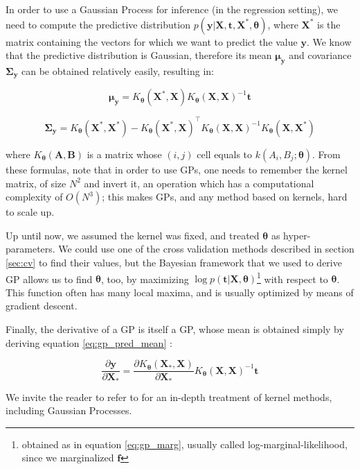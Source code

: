 \documentclass[a4paper,11pt]{kth-mag}
\begin{document}
In order to use a Gaussian Process for inference (in the regression setting), we need to compute the predictive distribution $p(\bm y\vert\bm X, \bm t, \bm X^*,\bm\theta) $, where $\bm X^*$ is the matrix containing the vectors for which we want to predict the value $\bm y$. We know that the predictive distribution is Gaussian, therefore its mean $\bm\mu_{\bm y}$ and covariance $\bm\Sigma_{\bm y}$ can be obtained relatively easily, resulting in:

\begin{equation}
\label{eq:gp_pred_mean}
\bm\mu_{\bm y}=K_{\bm\theta}(\bm X^*,\bm X) K_{\bm\theta}(\bm X,\bm X)^{-1}\bm t
\end{equation}

\begin{equation}
\bm\Sigma_{\bm y}=K_{\bm\theta}(\bm X^*,\bm X^*)-K_{\bm\theta}(\bm X^*,\bm X)^\intercal K_{\bm\theta}(\bm X, \bm X)^{-1}K_{\bm\theta}(\bm X,\bm X^*)
\end{equation}

\noindent where $K_{\bm\theta}(\bm A,\bm B)$ is a matrix whose $(i,j)$ cell equals to $k(A_i,B_j;\bm\theta)$. From these formulas, note that in order to use GPs, one needs to remember the kernel matrix, of size $N^2$ and invert it, an operation which has a computational complexity of $O(N^3)$; this makes GPs, and any method based on kernels, hard to scale up.

Up until now, we assumed the kernel was fixed, and treated $\bm\theta$ as hyper-parameters. We could use one of the cross validation methods described in section \ref{sec:cv} to find their values, but the Bayesian framework that we used to derive GP allows us to find $\bm\theta$, too, by maximizing $\log p(\bm t\vert\bm X,\bm\theta)$\footnote{obtained as in equation \ref{eq:gp_marg}, usually called log-marginal-likelihood, since we marginalized $\bm f$} with respect to $\bm\theta$. This function often has many local maxima, and is usually optimized by means of gradient descent.

Finally, the derivative of a GP is itself a GP, whose mean is obtained simply by deriving equation \ref{eq:gp_pred_mean} \citep{gp_diff}:

\begin{equation}
\label{eq:gp_gradient}
\frac{\partial\bm y}{\partial\bm X_*}=\frac{\partial K_{\bm\theta}(\bm X_*,\bm X)}{\partial\bm X_*}K_{\bm\theta}(\bm X,\bm X)^{-1}\bm t
\end{equation}

We invite the reader to refer to \cite[Chapter~6]{bishop} for an in-depth treatment of kernel methods, including Gaussian Processes.
\end{document}

